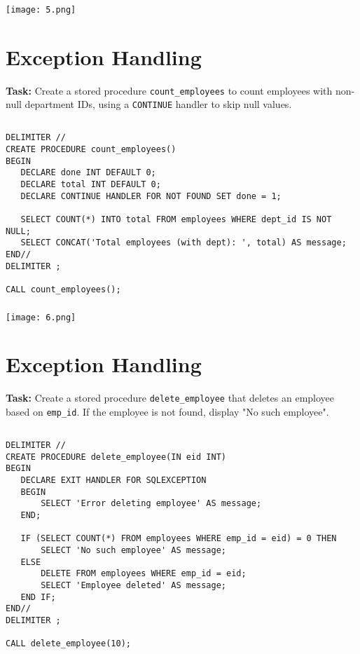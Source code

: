 \documentclass[12pt, a4paper]{article}
\begin{document}
\subsubsection{}
\begin{center}
    \texttt{[image: 5.png]}
\end{center}

\section{Exception Handling}
\textbf{Task:} Create a stored procedure \texttt{count\_employees} to count employees 
with non-null department IDs, using a \texttt{CONTINUE} handler to skip null values.

\subsection{}
\begin{lstlisting}
DELIMITER //
CREATE PROCEDURE count_employees()
BEGIN
   DECLARE done INT DEFAULT 0;
   DECLARE total INT DEFAULT 0;
   DECLARE CONTINUE HANDLER FOR NOT FOUND SET done = 1;
  
   SELECT COUNT(*) INTO total FROM employees WHERE dept_id IS NOT NULL;
   SELECT CONCAT('Total employees (with dept): ', total) AS message;
END//
DELIMITER ;

CALL count_employees();

\end{lstlisting}

\subsubsection{}
\begin{center}
    \texttt{[image: 6.png]}
\end{center}

\section{Exception Handling}
\textbf{Task:} Create a stored procedure \texttt{delete\_employee} that deletes an employee 
based on \texttt{emp\_id}. If the employee is not found, display "No such employee".

\subsection{}
\begin{lstlisting}
DELIMITER //
CREATE PROCEDURE delete_employee(IN eid INT)
BEGIN
   DECLARE EXIT HANDLER FOR SQLEXCEPTION
   BEGIN
       SELECT 'Error deleting employee' AS message;
   END;

   IF (SELECT COUNT(*) FROM employees WHERE emp_id = eid) = 0 THEN
       SELECT 'No such employee' AS message;
   ELSE
       DELETE FROM employees WHERE emp_id = eid;
       SELECT 'Employee deleted' AS message;
   END IF;
END//
DELIMITER ;

CALL delete_employee(10);

\end{lstlisting}
\end{document}
